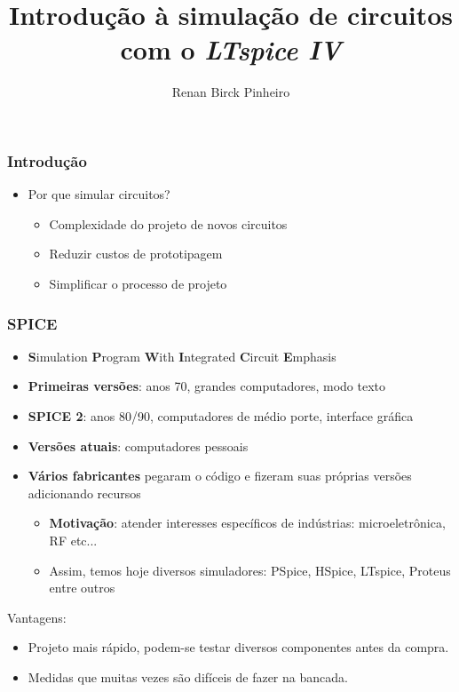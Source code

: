 \documentclass{beamer}
\title{Introdução à simulação de circuitos com o \textit{LTspice IV}}
\author{Renan Birck Pinheiro}
\institute{Universidade Federal de Santa Maria}
\begin{document}
\begin{frame}
\titlepage
\end{frame}

\begin{frame} %
\frametitle{Introdução}
\begin{itemize}
\item{Por que simular circuitos?}
\begin{itemize}
\pause
\item{Complexidade do projeto de novos circuitos}
\pause
\item{Reduzir custos de prototipagem}
\pause
\item{Simplificar o processo de projeto}
\end{itemize}
\end{itemize}
\end{frame} %

\begin{frame} %
\frametitle{SPICE}
\begin{itemize}
\item{\textbf{S}imulation \textbf{P}rogram \textbf{W}ith \textbf{I}ntegrated \textbf{C}ircuit \textbf{E}mphasis}
\item{\textbf{Primeiras versões}: anos 70, grandes computadores, modo texto}
\item{\textbf{SPICE 2}: anos 80/90, computadores de médio porte, interface gráfica}
\item{\textbf{Versões atuais}: computadores pessoais}
\pause
\item{\textbf{Vários fabricantes} pegaram o código e fizeram suas próprias versões adicionando recursos}
\begin{itemize}
\item{\textbf{Motivação}: atender interesses específicos de indústrias: microeletrônica, RF etc...}
\item{Assim, temos hoje diversos simuladores: PSpice, HSpice, LTspice, Proteus entre outros}

\end{itemize}
\end{itemize}
\end{frame} %

\begin{frame}
Vantagens:
\begin{itemize}
\item{Projeto} mais rápido, podem-se testar diversos componentes antes da compra.
\item{Medidas} que muitas vezes são difíceis de fazer na bancada.
\end{itemize}

\end{frame}
\end{document}
